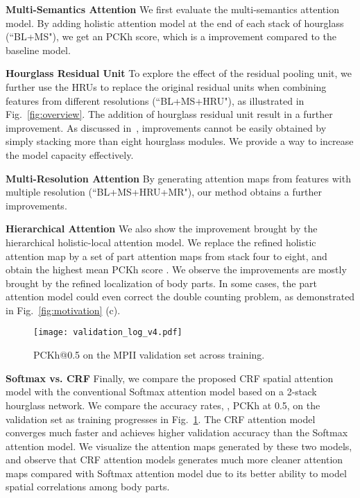 \documentclass[10pt,twocolumn,letterpaper]{article}
\newcommand{\smalltitle}[1]{\vspace{0.2em}\noindent \textbf{{#1}}}
\begin{document}
\smalltitle{Multi-Semantics Attention} 
We first evaluate the multi-semantics attention model. By adding holistic attention model at the end of each stack of hourglass (``BL+MS"), we get an  PCKh score, which is a  improvement compared to the baseline model. 

\smalltitle{Hourglass Residual Unit} 
To explore the effect of the residual pooling unit, we further use the HRUs to replace the original residual units when combining features from different resolutions (``BL+MS+HRU"), as illustrated in Fig.~\ref{fig:overview}. The addition of hourglass residual unit result in a further  improvement. 
As discussed in~\cite{newell2016stacked}, improvements cannot be easily obtained by simply stacking more than eight hourglass modules. 
We provide a way to increase the model capacity effectively.  


\smalltitle{Multi-Resolution Attention} 
By generating attention maps from features with multiple resolution (``BL+MS+HRU+MR"), our method obtains a further  improvements.   


\smalltitle{Hierarchical Attention} 
We also show the improvement brought by the hierarchical holistic-local attention model. We replace the refined holistic attention map by a set of part attention maps from stack four to eight, and obtain the highest mean PCKh score . 
We observe the improvements are mostly brought by the refined localization of body parts. 
In some cases, the part attention model could even correct the double counting problem, as demonstrated in Fig.~\ref{fig:motivation} (c).

\begin{figure} \begin{center}
    \texttt{[image: validation\_log\_v4.pdf]}
  \end{center}
  \vspace{-2em}
  \caption{\small PCKh@0.5 on the MPII validation set across training.}
    \vspace{-1.5em}
  \label{fig:valid_acc}
\end{figure}


\smalltitle{Softmax vs. CRF} Finally, we compare the proposed CRF spatial attention model with the conventional Softmax attention model based on a 2-stack hourglass network. We compare the accuracy rates, \ie, PCKh at 0.5, on the validation set as training progresses in Fig.~\ref{fig:valid_acc}. The CRF attention model converges much faster and achieves higher validation accuracy than the Softmax attention model. 
We visualize the attention maps generated by these two models, and observe that CRF attention models generates much more cleaner attention maps compared with Softmax attention model due to its better ability to model spatial correlations among body parts.
\end{document}
